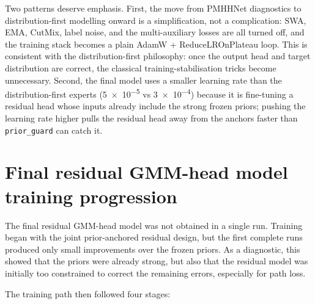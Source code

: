 Two patterns deserve emphasis. First, the move from PMHHNet diagnostics to distribution-first modelling
onward is a simplification, not a complication: SWA, EMA, CutMix, label noise,
and the multi-auxiliary losses are all turned off, and the training stack
becomes a plain AdamW + ReduceLROnPlateau loop. This is consistent with the
distribution-first philosophy: once the output head and target distribution
are correct, the classical training-stabilisation tricks become unnecessary.
Second, the final model uses a smaller learning rate than the distribution-first experts
(\num{5e-5} vs \num{3e-4}) because it is fine-tuning a residual head whose
inputs already include the strong frozen priors; pushing the learning
rate higher pulls the residual head away from the anchors faster than
\texttt{prior\_guard} can catch it.

\section{Final residual GMM-head model training progression}
\label{sec:try80_training_progression}

The final residual GMM-head model was not obtained in a single run. Training began with
the joint prior-anchored residual design, but the first complete runs produced
only small improvements over the frozen priors. As a diagnostic,
this showed that the priors were already strong, but also that the residual
model was initially too constrained to correct the remaining errors, especially
for path loss.

The training path then followed four stages:

